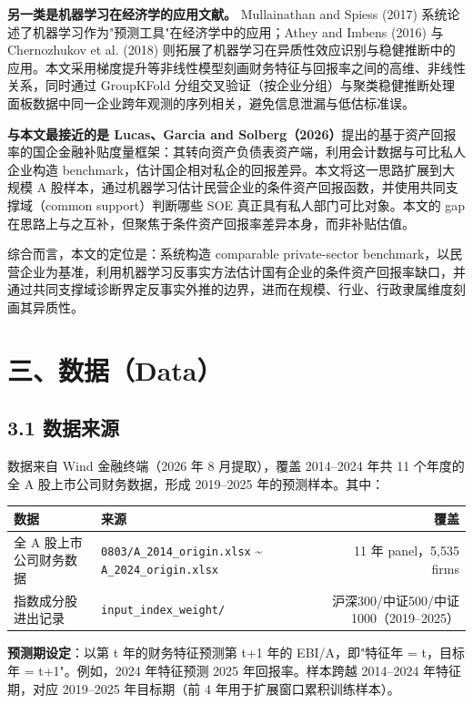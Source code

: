 \documentclass[11pt,a4paper]{ctexart}
\begin{document}
\textbf{另一类是机器学习在经济学的应用文献。} Mullainathan and Spiess (2017) 系统论述了机器学习作为"预测工具"在经济学中的应用；Athey and Imbens (2016) 与 Chernozhukov et al. (2018) 则拓展了机器学习在异质性效应识别与稳健推断中的应用。本文采用梯度提升等非线性模型刻画财务特征与回报率之间的高维、非线性关系，同时通过 GroupKFold 分组交叉验证（按企业分组）与聚类稳健推断处理面板数据中同一企业跨年观测的序列相关，避免信息泄漏与低估标准误。

\textbf{与本文最接近的是 Lucas、Garcia and Solberg（2026）}提出的基于资产回报率的国企金融补贴度量框架：其转向资产负债表资产端，利用会计数据与可比私人企业构造 benchmark，估计国企相对私企的回报差异。本文将这一思路扩展到大规模 A 股样本，通过机器学习估计民营企业的条件资产回报函数，并使用共同支撑域（common support）判断哪些 SOE 真正具有私人部门可比对象。本文的 gap 在思路上与之互补，但聚焦于条件资产回报率差异本身，而非补贴估值。

综合而言，本文的定位是：系统构造 comparable private-sector benchmark，以民营企业为基准，利用机器学习反事实方法估计国有企业的条件资产回报率缺口，并通过共同支撑域诊断界定反事实外推的边界，进而在规模、行业、行政隶属维度刻画其异质性。

\section{三、数据（Data）}

\subsection{3.1 数据来源}

数据来自 Wind 金融终端（2026 年 8 月提取），覆盖 2014--2024 年共 11 个年度的全 A 股上市公司财务数据，形成 2019--2025 年的预测样本。其中：

\begin{center}
\centering
\small
\begin{tabular}{llr}
\toprule
数据 & 来源 & 覆盖 \\
\midrule
全 A 股上市公司财务数据 & \texttt{0803/A\_2014\_origin.xlsx} \textasciitilde{} \texttt{A\_2024\_origin.xlsx} & 11 年 panel，5,535 firms \\
指数成分股进出记录 & \texttt{input\_index\_weight/} & 沪深300/中证500/中证1000（2019--2025） \\
\bottomrule
\end{tabular}
\end{center}

\textbf{预测期设定}：以第 t 年的财务特征预测第 t+1 年的 EBI/A，即"特征年 = t，目标年 = t+1"。例如，2024 年特征预测 2025 年回报率。样本跨越 2014--2024 年特征期，对应 2019--2025 年目标期（前 4 年用于扩展窗口累积训练样本）。
\end{document}
